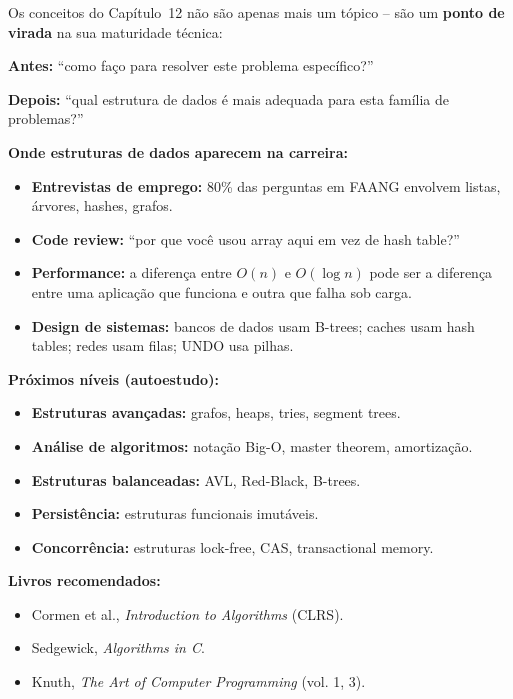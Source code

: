 \documentclass[12pt,a4paper]{article}
\begin{document}
\begin{tcolorbox}[colback=ecolightgreen,colframe=ecogreen,
  title={\bfseries Estruturas de dados: o ponto de virada da carreira}]

Os conceitos do Capítulo~12 não são apenas mais um tópico -- são um
\textbf{ponto de virada} na sua maturidade técnica:

\textbf{Antes:} ``como faço para resolver este problema específico?''

\textbf{Depois:} ``qual estrutura de dados é mais adequada para esta família de
problemas?''

\textbf{Onde estruturas de dados aparecem na carreira:}
\begin{itemize}[noitemsep]
  \item \textbf{Entrevistas de emprego:} 80\% das perguntas em FAANG envolvem
  listas, árvores, hashes, grafos.
  \item \textbf{Code review:} ``por que você usou array aqui em vez de hash table?''
  \item \textbf{Performance:} a diferença entre $O(n)$ e $O(\log n)$ pode ser
  a diferença entre uma aplicação que funciona e outra que falha sob carga.
  \item \textbf{Design de sistemas:} bancos de dados usam B-trees; caches usam
  hash tables; redes usam filas; UNDO usa pilhas.
\end{itemize}

\textbf{Próximos níveis (autoestudo):}
\begin{itemize}[noitemsep]
  \item \textbf{Estruturas avançadas:} grafos, heaps, tries, segment trees.
  \item \textbf{Análise de algoritmos:} notação Big-O, master theorem, amortização.
  \item \textbf{Estruturas balanceadas:} AVL, Red-Black, B-trees.
  \item \textbf{Persistência:} estruturas funcionais imutáveis.
  \item \textbf{Concorrência:} estruturas lock-free, CAS, transactional memory.
\end{itemize}

\textbf{Livros recomendados:}
\begin{itemize}[noitemsep]
  \item Cormen et al., \textit{Introduction to Algorithms} (CLRS).
  \item Sedgewick, \textit{Algorithms in C}.
  \item Knuth, \textit{The Art of Computer Programming} (vol. 1, 3).
\end{itemize}
\end{tcolorbox}
\end{document}
